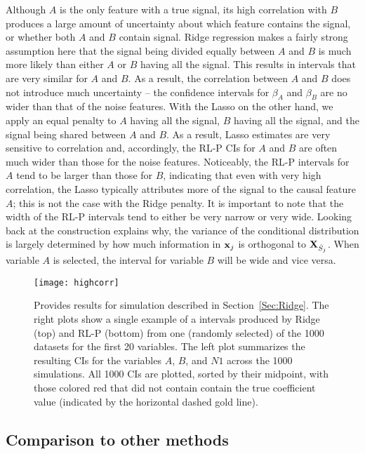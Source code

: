 Although $A$ is the only feature with a true signal, its high correlation with $B$ produces a large amount of uncertainty about which feature contains the signal, or whether both $A$ and $B$ contain signal. Ridge regression makes a fairly strong assumption here that the signal being divided equally between $A$ and $B$ is much more likely than either $A$ or $B$ having all the signal. This results in intervals that are very similar for $A$ and $B$. As a result, the correlation between $A$ and $B$ does not introduce much uncertainty -- the confidence intervals for $\beta_A$ and $\beta_B$ are no wider than that of the noise features. With the Lasso on the other hand, we apply an equal penalty to $A$ having all the signal, $B$ having all the signal, and the signal being shared between $A$ and $B$. As a result, Lasso estimates are very sensitive to correlation and, accordingly, the RL-P CIs for $A$ and $B$ are often much wider than those for the noise features. Noticeably, the RL-P intervals for $A$ tend to be larger than those for $B$, indicating that even with very high correlation, the Lasso typically attributes more of the signal to the causal feature $A$; this is not the case with the Ridge penalty. It is important to note that the width of the RL-P intervals tend to either be very narrow or very wide. Looking back at the construction explains why, the variance of the conditional distribution is largely determined by how much information in $\mathbf{x}_j$ is orthogonal to $\mathbf{X}_{\hat{S}_j}$. When variable $A$ is selected, the interval for variable $B$ will be wide and vice versa.

\begin{figure}[htb!]
  \begin{center}
  \texttt{[image: highcorr]}
  \caption{\label{Fig:highcorr} Provides results for simulation described in Section~\ref{Sec:Ridge}. The right plots show a single example of a intervals produced by Ridge (top) and RL-P (bottom) from one (randomly selected) of the 1000 datasets for the first 20 variables. The left plot summarizes the resulting CIs for the variables $A$, $B$, and $N1$ across the 1000 simulations. All 1000 CIs are plotted, sorted by their midpoint, with those colored red that did not contain contain the true coefficient value (indicated by the horizontal dashed gold line).}
  \end{center}
\end{figure}

\subsection{Comparison to other methods} \label{Sec:Comparison}

